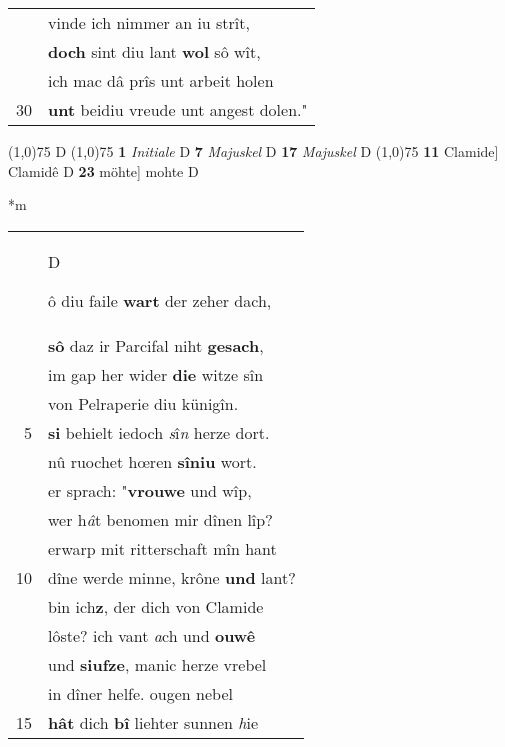 \documentclass[8pt,a4paper,notitlepage]{article}
\begin{document}
\begin{table}[ht]
\begin{minipage}[t]{0.5\linewidth}
\begin{tabular}{rl}
 & vinde ich nimmer an iu strît,\\ 
 & \textbf{doch} sint diu lant \textbf{wol} sô wît,\\ 
 & ich mac dâ prîs unt arbeit holen\\ 
30 & \textbf{unt} beidiu vreude unt angest dolen."\\ 
\end{tabular}
\scriptsize
\line(1,0){75} \newline
D \newline
\line(1,0){75} \newline
\textbf{1} \textit{Initiale} D  \textbf{7} \textit{Majuskel} D  \textbf{17} \textit{Majuskel} D  \newline
\line(1,0){75} \newline
\textbf{11} Clamide] Clamidê D \textbf{23} möhte] mohte D \newline
\end{minipage}
\hspace{0.5cm}
\begin{minipage}[t]{0.5\linewidth}
\small
\begin{center}*m
\end{center}
\begin{tabular}{rl}
 & \begin{large}D\end{large}ô diu faile \textbf{wart} der zeher dach,\\ 
 & \textbf{sô} daz ir Parcifal niht \textbf{gesach},\\ 
 & im gap her wider \textbf{die} witze sîn\\ 
 & von Pelraperie diu künigîn.\\ 
5 & \textbf{si} behielt iedoch \textit{s}î\textit{n} herze dort.\\ 
 & nû ruochet hœren \textbf{sîniu} wort.\\ 
 & er sprach: "\textbf{vrouwe} und wîp,\\ 
 & wer h\textit{â}t benomen mir dînen lîp?\\ 
 & erwarp mit ritterschaft mîn hant\\ 
10 & dîne werde minne, krône \textbf{und} lant?\\ 
 & bin ich\textbf{z}, der dich von Clamide\\ 
 & lôste? ich vant \textit{a}ch und \textbf{ouwê}\\ 
 & und \textbf{siufze}, manic herze vrebel\\ 
 & in dîner helfe. ougen nebel\\ 
15 & \textbf{hât} dich \textbf{bî} liehter sunnen \textit{h}ie\\ 

\end{tabular}
\end{minipage}
\end{table}
\end{document}
